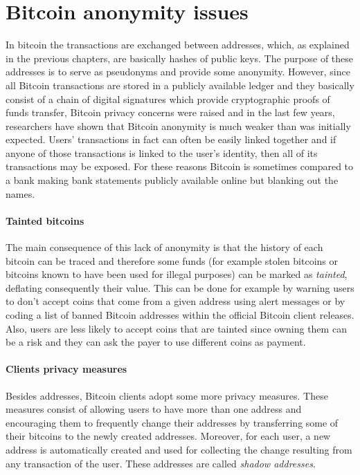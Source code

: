 \section{Bitcoin anonymity issues} In bitcoin the transactions are exchanged
between addresses, which, as explained in the previous chapters, are basically
hashes of public keys. The purpose of these addresses is to serve as pseudonyms
and provide some anonymity. However, since all Bitcoin transactions are stored
in a publicly available ledger and they basically consist of a chain of
digital signatures which provide cryptographic proofs of funds transfer, Bitcoin
privacy concerns were raised and in the last few years, researchers have shown
that Bitcoin anonymity is much weaker than was initially expected. Users’
transactions in fact can often be easily linked together and if anyone of those
transactions is linked to the user’s identity, then all of its transactions may
be exposed. For these reasons Bitcoin is sometimes compared to a bank making
bank statements publicly available online but blanking out the names.

\paragraph{Tainted bitcoins} The main consequence of this lack of anonymity is
that the history of each bitcoin can be traced and therefore some funds (for example
stolen bitcoins or bitcoins known to have been used for illegal purposes) can be
marked as \emph{tainted}, deflating consequently their value.  This can be done
for example by warning users to don't accept coins that come from a given
address using alert messages or by coding a list of banned Bitcoin addresses
within the official Bitcoin client releases. Also, users are less likely to
accept coins that are tainted since owning them  can be a risk and they can ask
the payer to use different coins as payment.


\paragraph{Clients privacy measures} Besides addresses, Bitcoin clients
adopt some more privacy measures. These measures consist of allowing users to
have more than one address and encouraging them to frequently change their
addresses by transferring some of their bitcoins to the newly created addresses.
Moreover, for each user, a new address is automatically created and used for
collecting the change resulting from any transaction of the user. These
addresses are called \emph{shadow addresses}.







